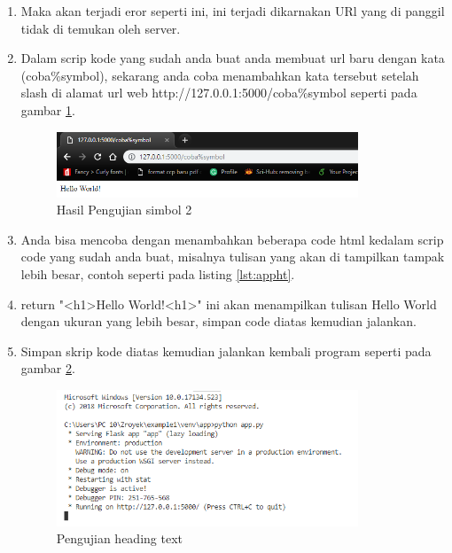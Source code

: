 \begin{enumerate}
\item Maka akan terjadi eror seperti ini, ini terjadi dikarnakan URl yang di panggil tidak di temukan oleh server. 
\item Dalam scrip kode yang sudah anda buat anda membuat url baru dengan kata (coba\%symbol), sekarang anda coba menambahkan kata tersebut setelah slash di alamat url web  http://127.0.0.1:5000/coba\%symbol  seperti pada gambar \ref{fig:hujisim2}.
\begin{figure}[!htbp]
	\centerline{\includegraphics[width=0.85\textwidth]{figures/9/hujisim2.PNG}}
	\caption{Hasil Pengujian simbol 2}
	\label{fig:hujisim2}
\end{figure}

\item Anda bisa mencoba dengan menambahkan beberapa code html kedalam scrip code yang sudah anda buat, misalnya tulisan yang akan di tampilkan tampak lebih besar, contoh seperti pada listing \ref{lst:appht}.


\item return "<h1>Hello World!<h1>"  ini akan menampilkan tulisan Hello World dengan ukuran yang lebih besar, simpan code diatas kemudian jalankan.
\item Simpan skrip kode diatas kemudian jalankan kembali program seperti pada gambar \ref{fig:ujiht}.
\begin{figure}[!htbp]
	\centerline{\includegraphics[width=0.85\textwidth]{figures/9/ujiht.PNG}}
	\caption{Pengujian heading text}
	\label{fig:ujiht}
\end{figure}


\end{enumerate}
